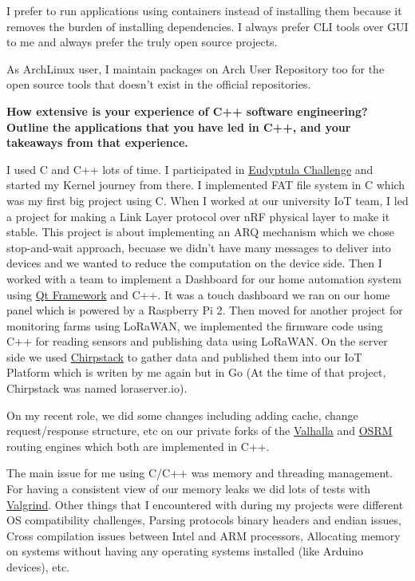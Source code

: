 I prefer to run applications using containers instead of installing them because it removes the burden of installing
dependencies. I always prefer CLI tools over GUI to me and always prefer the truly open source projects.

As ArchLinux user, I maintain packages on Arch User Repository too for the open source tools that doesn't exist
in the official repositories.

\noindent
\textbf{How extensive is your experience of C++ software engineering? Outline the applications that you have led in C++,
and your takeaways from that experience.}

I used C and C++ lots of time.
I participated in \href{http://eudyptula-challenge.org/}{Eudyptula Challenge} and started my Kernel journey from there.
I implemented FAT file system in C which was my first big project using C. When I worked
at our university IoT team, I led a project for making a Link Layer protocol over nRF physical layer to make it stable.
This project is about implementing an ARQ mechanism which we chose stop-and-wait approach, becuase we didn't have many messages
to deliver into devices and we wanted to reduce the computation on the device side.
Then I worked with a team to implement a Dashboard for our home automation system
using \href{https://www.qt.io/product/framework}{Qt Framework} and C++. It was
a touch dashboard we ran on our home panel which is powered by a Raspberry Pi 2.
Then moved for another project for monitoring farms using LoRaWAN, we implemented the firmware code using C++ for reading
sensors and publishing data using LoRaWAN. On the server side we used \href{https://www.chirpstack.io/}{Chirpstack}
to gather data and published them into our IoT Platform which is writen by me again but in Go
(At the time of that project, Chirpstack was named loraserver.io).

On my recent role, we did some changes including adding cache, change request/response structure, etc
on our private forks of the \href{https://github.com/valhalla/valhalla}{Valhalla} and
\href{https://github.com/Project-OSRM/osrm-backend}{OSRM} routing engines which both are implemented in C++.

The main issue for me using C/C++ was memory and threading management.
For having a consistent view of our memory leaks we did lots of tests with \href{https://valgrind.org/}{Valgrind}.
Other things that I encountered with during my projects were different OS compatibility challenges,
Parsing protocols binary headers and endian issues, Cross compilation issues between Intel and ARM processors,
Allocating memory on systems without having any operating systems installed (like Arduino devices), etc.

